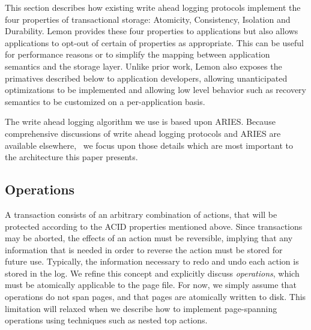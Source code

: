 \documentclass[letterpaper,twocolumn,english]{article}
\newcommand{\yad}{Lemon\xspace}
\begin{document}
This section describes how existing write ahead logging protocols
implement the four properties of transactional storage: Atomicity,
Consistency, Isolation and Durability.  \yad provides these four
properties to applications but also allows applications to opt-out of
certain of properties as appropriate.  This can be useful for
performance reasons or to simplify the mapping between application
semantics and the storage layer.  Unlike prior work, \yad also
exposes the primatives described below to application developers,
allowing unanticipated optimizations to be implemented and allowing
low level behavior such as recovery semantics to be customized on a
per-application basis.

The write ahead logging algorithm we use is based upon ARIES. Because
comprehensive discussions of write ahead logging protocols and ARIES
are available elsewhere,~\cite{haerder, aries} we focus upon those
details which are most important to the architecture this paper
presents.



%


\subsection{Operations\label{sub:OperationProperties}}

A transaction consists of an arbitrary combination of actions, that
will be protected according to the ACID properties mentioned above.
Since transactions may be aborted, the effects of an action must be
reversible, implying that any information that is needed in order to
reverse the action must be stored for future use.  Typically, the
information necessary to redo and undo each action is stored in the
log.  We refine this concept and explicitly discuss {\em operations},
which must be atomically applicable to the page file.  For now, we
simply assume that operations do not span pages, and that pages are
atomically written to disk.  This limitation will relaxed when we
describe how to implement page-spanning operations using techniques
such as nested top actions.
\end{document}

